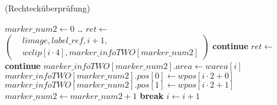 \begin{algorithm}[!ht]
\caption{ (Rechtecküberprüfung)}
\label{alg:detectmarker2-3}
\begin{algorithmic}[1]
	\State $\mathit{marker\_num2} \gets 0$
	\label{alg:detectmarker2-3-loop-start}
		\State \ldots
		\State $\mathit{ret} \gets$ $\left(
		\begin{aligned}
			& \mathit{limage}, \mathit{label\_ref}, i + 1,\\
			& \mathit{wclip}[i \cdot 4], \mathit{marker\_infoTWO}[\mathit{marker\_num2}]
		\end{aligned}\right)$
		\label{alg:detectmarker2-3-retvalue}
			\State \textbf{continue}
			\label{alg:detectmarker2-3-continue}
		\EndIf
		\State $\mathit{ret} \gets$ 
		\label{alg:detectmarker2-3-checksquare}
			\State \textbf{continue}
			\label{alg:detectmarker2-3-continue2}
		\EndIf
		\State $\mathit{marker\_infoTWO}[marker\_num2].area \gets \mathit{warea}[i]$
		\label{alg:detectmarker2-3-save-start}
		\State $\mathit{marker\_infoTWO}[marker\_num2].pos[0] \gets \mathit{wpos}[i \cdot 2 + 0]$
		\State $\mathit{marker\_infoTWO}[marker\_num2].pos[1] \gets \mathit{wpos}[i \cdot 2 + 1]$
		\State $\mathit{marker\_num2} \gets \mathit{marker\_num2} + 1$
		\label{alg:detectmarker2-3-save-end}
		\label{alg:detectmarker2-3-maxpatterns}
			\State \textbf{break}
		\EndIf
		\State $i \gets i + 1$
	\EndFor
	\label{alg:detectmarker2-3-loop-end}
\end{algorithmic}
\end{algorithm}
